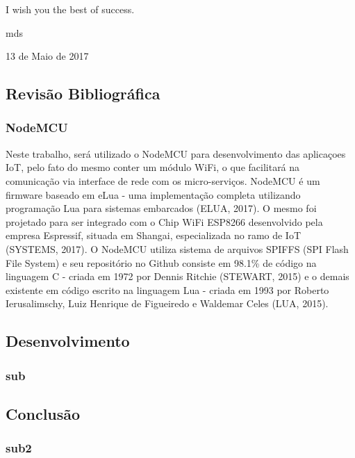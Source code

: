 \documentclass[journal]{IEEEtran}
\begin{document}


I wish you the best of success.

\hfill mds
 
\hfill 13 de Maio de 2017

\subsection{Revisão Bibliográfica}
\subsubsection{NodeMCU}

Neste trabalho, será utilizado o NodeMCU para desenvolvimento das aplicaçoes IoT, pelo fato do mesmo conter um módulo WiFi, o que facilitará na comunicação via interface de rede com os micro-serviços. NodeMCU é um firmware baseado em eLua - uma implementação completa utilizando programação Lua para sistemas embarcados (ELUA, 2017). O mesmo foi projetado para ser integrado com o Chip WiFi ESP8266 desenvolvido pela empresa Espressif, situada em Shangai, especializada no ramo de IoT (SYSTEMS, 2017). O NodeMCU utiliza sistema de arquivos SPIFFS (SPI Flash File System) e seu repositório no Github consiste
 em 98.1\% de código na linguagem C - criada em 1972 por Dennis Ritchie (STEWART, 2015) e o demais existente em código escrito na linguagem Lua  - criada em 1993 por Roberto Ierusalimschy, Luiz Henrique de Figueiredo e Waldemar Celes (LUA, 2015).




\subsection{Desenvolvimento}
\subsubsection{sub}

\subsection{Conclusão}
\subsubsection{sub2}
\end{document}
